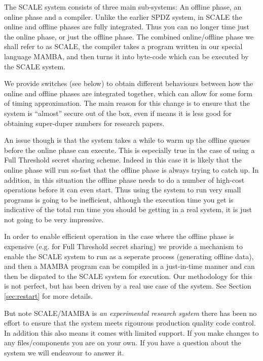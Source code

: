 

\label{sec:introduction}
The SCALE system consists of three main sub-systems:
An offline phase, an online phase and a compiler. 
Unlike the earlier SPDZ system, in SCALE the online
and offline phases are fully integrated. Thus you
can no longer time just the online phase, or just
the offline phase.
The combined online/offline phase we shall refer
to as SCALE, the compiler takes a program written
in our special language MAMBA, and then turns it
into byte-code which can be executed by the SCALE
system. 

We provide switches (see below) to obtain 
different behaviours between how the online and offline
phases are integrated together, which can allow for
some form of timing approximation.
The main reason for this change is to ensure that the
system is ``almost'' secure out of the box, even if
means it is less good for obtaining super-duper numbers
for research papers.

An issue though is that the system takes a while to warm
up the offline queues before the online phase can execute.
This is especially true in the case of using a Full Threshold
secret sharing scheme. Indeed in this case it is likely
that the online phase will run so-fast that the offline
phase is always trying to catch up. In addition, in this
situation the offline phase needs to do a number of
high-cost operations before it can even start. Thus
using the system to run very small programs is going to
be inefficient, although the execution time you get
is indicative of the total run time you should be getting
in a real system, it is just not going to be very
impressive.

In order to enable efficient operation in the case where the
offline phase is expensive (e.g. for Full Threshold secret sharing)
we provide a mechanism to enable the SCALE system to run
as a seperate process (generating offline data), and then
a MAMBA program can be compiled in a just-in-time manner
and can then be dispated to the SCALE system for
execution. Our methodology for this is not perfect, but has
been driven by a real use case of the system.
See Section \ref{sec:restart} for more details.

But note SCALE/MAMBA is {\em an experimental research system} 
there has been no effort to ensure that the system meets rigourous production
quality code control. 
In addition this also means it comes with limited support.
If you make changes to any files/components you are on your
own.
If you have a question about the system we will endeavour to
answer it.

